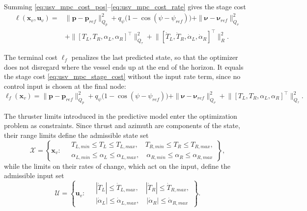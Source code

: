 Summing \eqref{eq:usv_mpc_cost_pos}--\eqref{eq:usv_mpc_cost_rate} gives the stage cost
\begin{equation}
    \begin{aligned}
        \ell(\mathbf{x}_v, \mathbf{u}_v) = {} & \|\mathbf{p}-\mathbf{p}_{ref}\|^2_{Q_p} + q_\psi\big(1-\cos(\psi-\psi_{ref})\big) + \|\boldsymbol{\nu}-\boldsymbol{\nu}_{ref}\|^2_{Q_\nu} \\
        & + \big\|[T_L,T_R,\alpha_L,\alpha_R]^\top\big\|^2_{Q_\tau} + \big\|[\dot{T}_L, \dot{T}_R, \dot{\alpha}_L, \dot{\alpha}_R]^\top\big\|^2_{R}.
    \end{aligned}
    \label{eq:usv_mpc_stage_cost}
\end{equation}

The terminal cost $\ell_f$ penalizes the last predicted state, so that the optimizer does not disregard where the vessel ends up at the end of the horizon. It equals the stage cost \eqref{eq:usv_mpc_stage_cost} without the input rate term, since no control input is chosen at the final node:
\begin{equation}
    \ell_f(\mathbf{x}_v) = \|\mathbf{p}-\mathbf{p}_{ref}\|^2_{Q_p} + q_\psi\big(1-\cos(\psi-\psi_{ref})\big) + \|\boldsymbol{\nu}-\boldsymbol{\nu}_{ref}\|^2_{Q_\nu} + \big\|[T_L,T_R,\alpha_L,\alpha_R]^\top\big\|^2_{Q_\tau}.
    \label{eq:usv_mpc_terminal_cost}
\end{equation}
 
The thruster limits introduced in the predictive model enter the optimization problem as constraints. Since thrust and azimuth are components of the state, their range limits define the admissible state set
\begin{equation}
    \mathcal{X} = \left\{ \mathbf{x}_v : \;
    \begin{aligned}
        & T_{L,min} \le T_L \le T_{L,max}, \quad T_{R,min} \le T_R \le T_{R,max}, \\
        & \alpha_{L,min} \le \alpha_L \le \alpha_{L,max}, \quad \alpha_{R,min} \le \alpha_R \le \alpha_{R,max}
    \end{aligned}
    \right\},
    \label{eq:usv_mpc_set_X}
\end{equation}
while the limits on their rates of change, which act on the input, define the admissible input set
\begin{equation}
    \mathcal{U} = \left\{ \mathbf{u}_v : \;
    \begin{aligned}
        & |\dot{T}_L| \le \dot{T}_{L,max}, \quad |\dot{T}_R| \le \dot{T}_{R,max}, \\
        & |\dot{\alpha}_L| \le \dot{\alpha}_{L,max}, \quad |\dot{\alpha}_R| \le \dot{\alpha}_{R,max}
    \end{aligned}
    \right\}.
    \label{eq:usv_mpc_set_U}
\end{equation}

